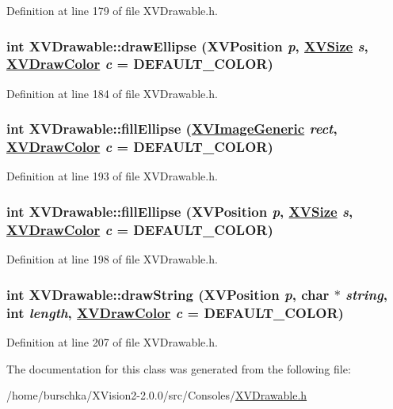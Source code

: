 Definition at line 179 of file XVDrawable.h.\label{XVDrawable_a11}
\hypertarget{class_XVDrawable_a11}{
\subsubsection[drawEllipse]{\setlength{\rightskip}{0pt plus 5cm}int XVDrawable::draw\-Ellipse (XVPosition {\em p}, \hyperlink{class_XVSize}{XVSize} {\em s}, \hyperlink{class_XVDrawColor}{XVDraw\-Color} {\em c} = DEFAULT\_\-COLOR)}}




Definition at line 184 of file XVDrawable.h.\label{XVDrawable_a13}
\hypertarget{class_XVDrawable_a13}{
\subsubsection[fillEllipse]{\setlength{\rightskip}{0pt plus 5cm}int XVDrawable::fill\-Ellipse (\hyperlink{class_XVImageGeneric}{XVImage\-Generic} {\em rect}, \hyperlink{class_XVDrawColor}{XVDraw\-Color} {\em c} = DEFAULT\_\-COLOR)}}




Definition at line 193 of file XVDrawable.h.\label{XVDrawable_a14}
\hypertarget{class_XVDrawable_a14}{
\subsubsection[fillEllipse]{\setlength{\rightskip}{0pt plus 5cm}int XVDrawable::fill\-Ellipse (XVPosition {\em p}, \hyperlink{class_XVSize}{XVSize} {\em s}, \hyperlink{class_XVDrawColor}{XVDraw\-Color} {\em c} = DEFAULT\_\-COLOR)}}




Definition at line 198 of file XVDrawable.h.\label{XVDrawable_a16}
\hypertarget{class_XVDrawable_a16}{
\subsubsection[drawString]{\setlength{\rightskip}{0pt plus 5cm}int XVDrawable::draw\-String (XVPosition {\em p}, char $\ast$ {\em string}, int {\em length}, \hyperlink{class_XVDrawColor}{XVDraw\-Color} {\em c} = DEFAULT\_\-COLOR)}}




Definition at line 207 of file XVDrawable.h.

The documentation for this class was generated from the following file:\begin{CompactItemize}
\item 
/home/burschka/XVision2-2.0.0/src/Consoles/\hyperlink{XVDrawable.h-source}{XVDrawable.h}\end{CompactItemize}
